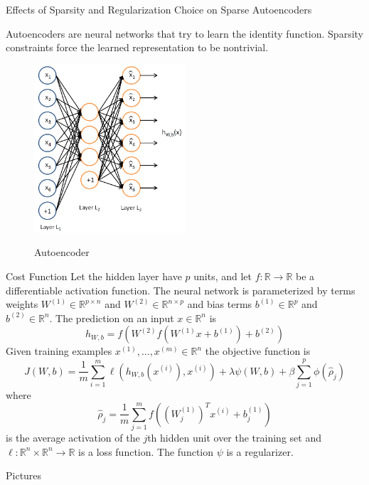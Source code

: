 \documentclass{beamer}
\newcommand{\RR}{\mathbb{R}}
\newcommand{\ra}{\rightarrow}
\newcommand{\Wo}{W^{(1)}}
\newcommand{\Wt}{W^{(2)}}
\newcommand{\bo}{b^{(1)}}
\newcommand{\bt}{b^{(2)}}
\newcommand{\xii}{x^{(i)}}
\begin{document}
\begin{frame}{Effects of Sparsity and Regularization Choice on Sparse Autoencoders}

Autoencoders are neural networks that try to learn the identity function.
Sparsity constraints force the learned representation to be nontrivial.

\begin{figure}[htb]
\begin{center}
\label{proc_sched}
\includegraphics[width=0.5\textwidth]{Autoencoder636.png}
\caption{Autoencoder}
\end{center}
\end{figure}

\end{frame}
\begin{frame}{Cost Function}
\small
Let the hidden layer have $p$ units, and let $f:\RR\ra\RR$ be a differentiable
activation function. The neural network is parameterized by terms weights
$\Wo\in\RR^{p\times n}$ and $\Wt\in\RR^{n\times p}$ and bias terms $\bo\in\RR^p$
and $\bt\in\RR^n$. The prediction on an input
$x\in\RR^n$ is
\[h_{W,b}=f(\Wt f(\Wo x+\bo)+\bt)\]
Given training examples $x^{(1)},\ldots,x^{(m)}\in\RR^n$ the objective function is
\[J(W,b)=\frac1m\sum_{i=1}^m\ell(h_{W,b}(\xii),\xii)+\lambda\psi(W,b)+\beta\sum_{j=1}^p\phi(\hat\rho_j)\]
where 
\[\hat\rho_j=\frac1m\sum_{j=1}^mf\left((\Wo_j)^T\xii+\bo_j\right)\] is 
the average activation of the $j$th hidden unit over the training set and $\ell:\RR^n\times\RR^n\ra\RR$ is a loss function. The function
$\psi$ is a regularizer.
\normalsize
\end{frame}
\begin{frame}{Pictures}

\end{frame}
\end{document}
